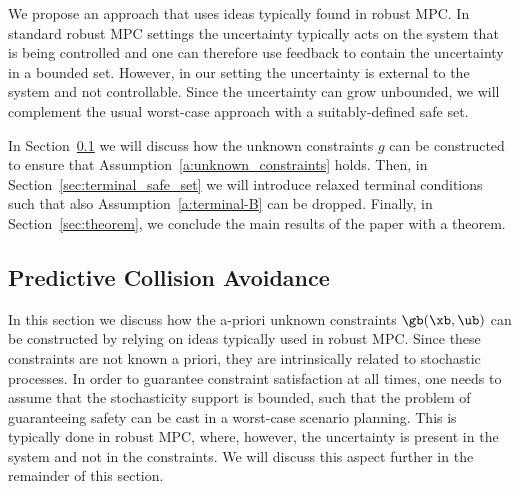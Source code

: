 \documentclass[journal]{IEEEtran}
\newcommand{\review}[1]{#1}
\begin{document}
	\review{We propose an approach that uses ideas typically found in robust MPC. In standard robust MPC settings the uncertainty typically acts on the system that is being controlled and one can therefore use feedback to contain the uncertainty in a bounded set. However, in our setting the uncertainty is external to the system and not controllable. Since the uncertainty can grow unbounded, we will complement the usual worst-case approach with a suitably-defined safe set.}
	
		In Section~\ref{sec:coll_avoidance} we will discuss how the unknown constraints $g$ can be constructed to ensure that Assumption~\ref{a:unknown_constraints} holds. 
		Then, in Section~\ref{sec:terminal_safe_set} we will introduce relaxed terminal conditions such that also Assumption~\ref{a:terminal-B} can be dropped. Finally, in Section~\ref{sec:theorem}, we conclude the main results of the paper with a theorem. 
	
	\subsection{Predictive Collision Avoidance}
	\label{sec:coll_avoidance}
	
	In this section we discuss how the a-priori unknown constraints $\gb(\xb,\ub)$ can be constructed by relying on ideas typically used in robust MPC. Since these constraints are not known a priori, they are intrinsically related to stochastic processes. In order to guarantee constraint satisfaction at all times, one needs to assume that the stochasticity support is bounded, such that the problem of guaranteeing safety can be cast in a worst-case scenario planning. This is typically done in robust MPC, where, however, the uncertainty is present in the system and not in the constraints. We will discuss this aspect further in the remainder of this section.
	
\end{document}
